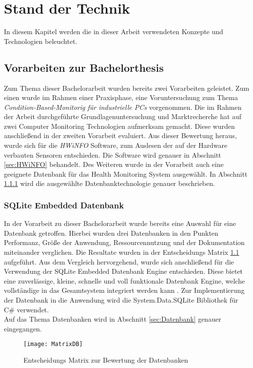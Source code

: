 \chapter{Stand der Technik}
In diesem Kapitel werden die in dieser Arbeit verwendeten Konzepte und Technologien beleuchtet. 

\section{Vorarbeiten zur Bachelorthesis}
Zum Thema dieser Bachelorarbeit wurden bereits zwei Vorarbeiten geleistet. Zum einen wurde im Rahmen einer Praxisphase, eine Voruntersuchung zum Thema \textit{Condition-Based-Monitorig für industrielle PCs}  vorgenommen. Die im Rahmen der Arbeit \cite{PAMathias} durchgeführte Grundlagenuntersuchung und Marktrecherche hat auf zwei Computer Monitoring Technologien aufmerksam gemacht. Diese wurden anschließend in der zweiten Vorarbeit \cite{t3000} evaluiert. Aus dieser Bewertung heraus, wurde sich für die \textit{HWiNFO} Software, zum Auslesen der auf der Hardware verbauten Sensoren entschieden. Die Software wird genauer in Abschnitt \ref{sec:HWiNFO} behandelt. Des Weiteren wurde in der Vorarbeit \cite{t3000} auch eine geeignete Datenbank für das Health Monitoring System ausgewählt. In Abschnitt \ref{sec:SQLite} wird die ausgewählte Datenbanktechnologie genauer beschrieben. 

\subsection{SQLite Embedded Datenbank}\label{sec:SQLite}
In der Vorarbeit zu dieser Bachelorarbeit wurde bereits eine Auswahl für eine Datenbank getroffen. Hierbei wurden drei Datenbanken in den Punkten Performanz, Größe der Anwendung, Ressourcennutzung und der Dokumentation miteinander verglichen. Die Resultate wurden in der Entscheidungs Matrix \ref{fig:MatrixDB} aufgeführt. Aus dem Vergleich  hervorgehend, wurde sich anschließend für die Verwendung der SQLite Embedded Datenbank Engine entschieden. Diese bietet eine zuverlässige, kleine, schnelle und voll funktionale Datenbank Engine, welche vollständige in das Gesamtsystem integriert werden kann \cite{SQLiteHompage}. Zur Implementierung der Datenbank in die Anwendung wird die System.Data.SQLite Bibliothek für C\# verwendet.\\ 
Auf das Thema Datenbanken wird in Abschnitt \ref{sec:Datenbank} genauer eingegangen.
\begin{flushleft}
    \begin{figure}[h!]
        \centering
        \texttt{[image: MatrixDB]}
        \caption{Entscheidungs Matrix zur Bewertung der Datenbanken \cite{t3000}}
        \label{fig:MatrixDB}
    \end{figure}
\end{flushleft}
